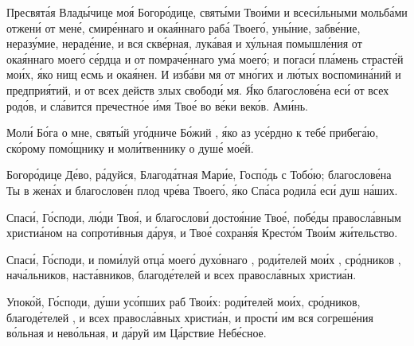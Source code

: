 \begin{mymulticols}

Пресвят\'{а}я Влад\'{ы}чице мо\'{я} Богор\'{о}дице, свят\'{ы}ми Тво\'{и}ми и всес\'{и}льными мольб\'{а}ми отжен\'{и} от мен\'{е}, смир\'{е}ннаго и ока\'{я}ннаго раб\'{а} Твоег\'{о}, ун\'{ы}ние, забв\'{е}ние, нераз\'{у}мие, нерад\'{е}ние, и вся скв\'{е}рная, лук\'{а}вая и х\'{у}льная помышл\'{е}ния от ока\'{я}ннаго моег\'{о} с\'{е}рдца и от помрач\'{е}ннаго ум\'{а} моег\'{о}; и погас\'{и} пл\'{а}мень страст\'{е}й мо\'{и}х, \'{я}ко нищ есмь и ока\'{я}нен. И изб\'{а}ви мя от мн\'{о}гих и л\'{ю}тых воспомин\'{а}ний и предпри\'{я}тий, и от всех действ злых свобод\'{и} мя. \'{Я}ко благослов\'{е}на ес\'{и} от всех род\'{о}в, и сл\'{а}вится пречестн\'{о}е \'{и}мя Тво\'{е} во в\'{е}ки век\'{о}в. Ам\'{и}нь.


Мол\'{и} Б\'{о}га о мне, свят\'{ы}й уг\'{о}дниче Б\'{о}жий , \'{я}ко аз ус\'{е}рдно к теб\'{е} прибег\'{а}ю, ск\'{о}рому пом\'{о}щнику и мол\'{и}твеннику о душ\'{е} мо\'{е}й.


Богор\'{о}дице Д\'{е}во, р\'{а}дуйся, Благод\'{а}тная Мар\'{и}е, Госп\'{о}дь с Тоб\'{о}ю; благослов\'{е}на Ты в жен\'{а}х и благослов\'{е}н плод чр\'{е}ва Твоег\'{о}, \'{я}ко Сп\'{а}са родил\'{а} ес\'{и} душ н\'{а}ших.


Спас\'{и}, Г\'{о}споди, л\'{ю}ди Тво\'{я}, и благослов\'{и} досто\'{я}ние Тво\'{е}, поб\'{е}ды правосл\'{а}вным христи\'{а}ном на сопрот\'{и}вныя д\'{а}руя, и Тво\'{е} сохран\'{я}я Крест\'{о}м Тво\'{и}м ж\'{и}тельство.


Спас\'{и}, Г\'{о}споди, и пом\'{и}луй отц\'{а} моег\'{о} дух\'{о}внаго , род\'{и}телей мо\'{и}х , ср\'{о}дников , нач\'{а}льников, наст\'{а}вников, благод\'{е}телей  и всех правосл\'{а}вных христи\'{а}н.


Упок\'{о}й, Г\'{о}споди, д\'{у}ши ус\'{о}пших раб Тво\'{и}х: род\'{и}телей мо\'{и}х, ср\'{о}дников, благод\'{е}телей , и всех правосл\'{а}вных христи\'{а}н, и прост\'{и} им вся согреш\'{е}ния в\'{о}льная и нев\'{о}льная, и д\'{а}руй им Ц\'{а}рствие Неб\'{е}сное.


\end{mymulticols}
